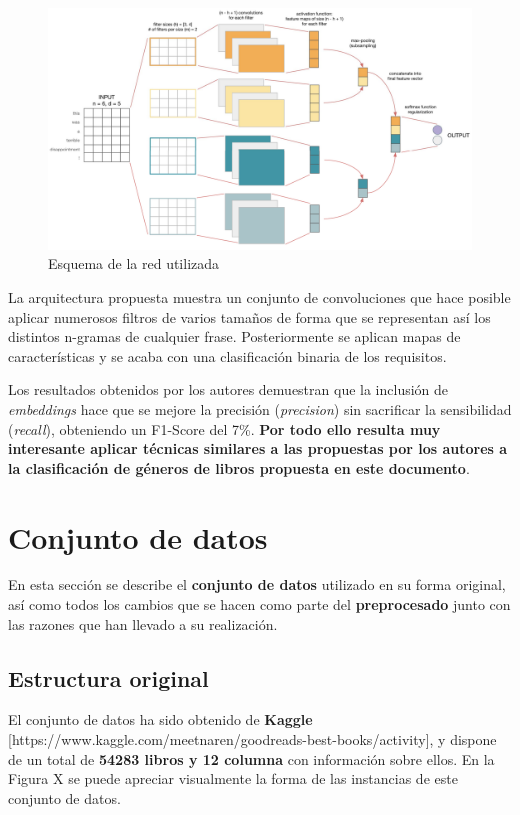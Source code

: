 \documentclass[12pt,a4paper, xcolor=table]{article}
\begin{document}
  \begin{figure}[!h]
    \centering
    \includegraphics[width=450px]{img/CNN Word2vect.png}
    \caption{Esquema de la red utilizada}
    \end{figure}

\vspace{3mm}

La arquitectura propuesta muestra un conjunto de convoluciones que hace posible aplicar numerosos filtros de varios tamaños de forma que se representan así los distintos n-gramas de cualquier frase. Posteriormente se aplican mapas de características y se acaba con una clasificación binaria de los requisitos.

\vspace{3mm}

Los resultados obtenidos por los autores demuestran que la inclusión de \textit{embeddings} hace que se mejore la precisión (\textit{precision}) sin sacrificar la sensibilidad (\textit{recall}), obteniendo un F1-Score del 7\%. \textbf{Por todo ello resulta muy interesante aplicar técnicas similares a las propuestas por los autores a la clasificación de géneros de libros propuesta en este documento}.

\newpage

\section{Conjunto de datos}
    En esta sección se describe el \textbf{conjunto de datos} utilizado en su forma original, así como todos los cambios que se hacen como parte del \textbf{preprocesado} junto con las razones que han llevado a su realización.

    \subsection{Estructura original}
    El conjunto de datos ha sido obtenido de \textbf{Kaggle} [https://www.kaggle.com/meetnaren/goodreads-best-books/activity], y dispone de un total de \textbf{54283 libros y 12 columna} con información sobre ellos. En la Figura X se puede apreciar visualmente la forma de las instancias de este conjunto de datos.
\end{document}
